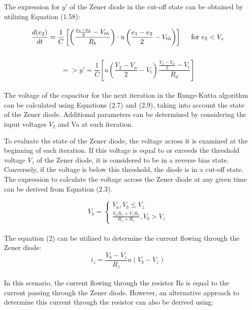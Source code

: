 The expression for $y'$ of the Zener diode in the cut-off state can be obtained by utilizing Equation (1.58):

\begin{equation}
     \frac{d(e_2)}{dt}=\frac{1}{C} \left[\left(\frac{\frac{e_1 - e_2}{2} - V_{th}}{R_b} \right) \cdot u\left(\frac{e_1-e_2}{2}-V_{th} \right) \right] \hspace{0.5cm} \text{for} \hspace{0.1cm} e_2 < V_z
    \label{eq:de2dt_reverse_bias}
\end{equation}\\

\begin{equation}
    =>y'=\frac{1}{C}[u(\frac{V_2-V_a}{2}-V_t)\frac{\frac{V_2-V_a}{2}-V_t}{R_d}]
\end{equation}\\

The voltage of the capacitor for the next iteration in the Runge-Kutta algorithm can be calculated using Equations (2.7) and (2.9), taking into account the state of the Zener diode. Additional parameters can be determined by considering the input voltages $V_2$ and Va at each iteration.

To evaluate the state of the Zener diode, the voltage across it is examined at the beginning of each iteration. If this voltage is equal to or exceeds the threshold voltage $V_z$ of the Zener diode, it is considered to be in a reverse bias state. Conversely, if the voltage is below this threshold, the diode is in a cut-off state. The expression to calculate the voltage across the Zener diode at any given time can be derived from Equation (2.3).

\begin{equation}
    V_b=\begin{cases}
        V_a, V_b \leq V_z\\
        \frac{V_aR_z+V_zR_s}{R_s+R_z}, V_b>V_z
    \end{cases}
\end{equation}\\

The equation (2) can be utilized to determine the current flowing through the Zener diode:\\

\begin{equation}
    i_z=\frac{V_b-V_z}{R_z}u(V_b-V_z)
\end{equation}\\

In this scenario, the current flowing through the resistor Rs is equal to the current passing through the Zener diode. However, an alternative approach to determine this current through the resistor can also be derived using:\\

